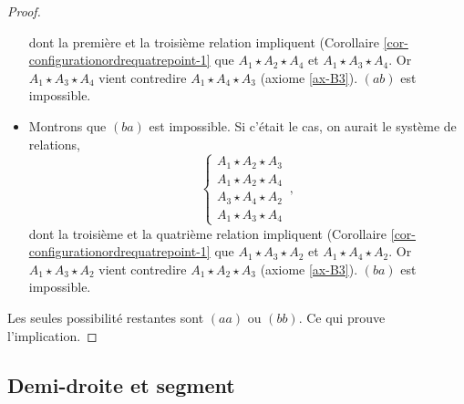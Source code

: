 \begin{cor}
\begin{proof}
\begin{itemize}[$\bullet$]
            dont la première et la troisième relation impliquent (Corollaire \ref{cor-configurationordrequatrepoint-1} que $A_1 \star A_2 \star A_4$ et $A_1 \star A_3 \star A_4$. Or $A_1 \star A_3 \star A_4$ vient contredire $A_1 \star A_4 \star A_3$ (axiome \ref{ax-B3}). $(ab)$ est impossible.
            \item Montrons que $(ba)$ est impossible. Si c'était le cas, on aurait le système de relations,
            \begin{equation*}
                \left\{\begin{array}{cc}
                     A_1 \star A_2 \star A_3  \\
                     A_1 \star A_2 \star A_4  \\
                     A_3 \star A_4 \star A_2 \\
                     A_1 \star A_3 \star A_4
                \end{array}\right.\,,
            \end{equation*}
            dont la troisième et la quatrième relation impliquent (Corollaire \ref{cor-configurationordrequatrepoint-1} que $A_1 \star A_3 \star A_2$ et $A_1 \star A_4 \star A_2$. Or $A_1 \star A_3 \star A_2$ vient contredire $A_1 \star A_2 \star A_3$ (axiome \ref{ax-B3}). $(ba)$ est impossible.
        \end{itemize}
        Les seules possibilité restantes sont $(aa)$ ou $(bb)$. Ce qui prouve l'implication.
    \end{proof}
\end{cor}

        \subsection{Demi-droite et segment}

